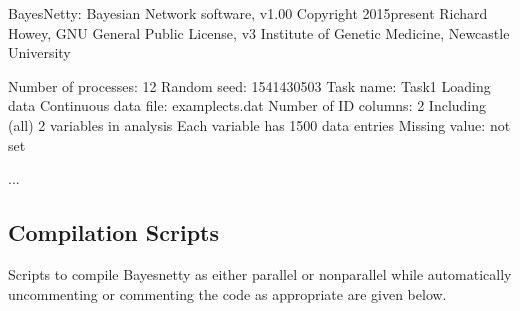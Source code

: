 \documentclass[letterpaper,10pt,english]{sphinxmanual}
\begin{document}
\begin{sphinxVerbatim}[commandchars=\\\{\}]
BayesNetty: Bayesian Network software, v1.00
\PYGZhy{}\PYGZhy{}\PYGZhy{}\PYGZhy{}\PYGZhy{}\PYGZhy{}\PYGZhy{}\PYGZhy{}\PYGZhy{}\PYGZhy{}\PYGZhy{}\PYGZhy{}\PYGZhy{}\PYGZhy{}\PYGZhy{}\PYGZhy{}\PYGZhy{}\PYGZhy{}\PYGZhy{}\PYGZhy{}\PYGZhy{}\PYGZhy{}\PYGZhy{}\PYGZhy{}\PYGZhy{}\PYGZhy{}\PYGZhy{}\PYGZhy{}\PYGZhy{}\PYGZhy{}\PYGZhy{}\PYGZhy{}\PYGZhy{}\PYGZhy{}\PYGZhy{}\PYGZhy{}\PYGZhy{}\PYGZhy{}\PYGZhy{}\PYGZhy{}\PYGZhy{}\PYGZhy{}\PYGZhy{}\PYGZhy{}\PYGZhy{}\PYGZhy{}\PYGZhy{}\PYGZhy{}\PYGZhy{}\PYGZhy{}
Copyright 2015\PYGZhy{}present Richard Howey, GNU General Public License, v3
Institute of Genetic Medicine, Newcastle University

Number of processes: 12
Random seed: 1541430503
\PYGZhy{}\PYGZhy{}\PYGZhy{}\PYGZhy{}\PYGZhy{}\PYGZhy{}\PYGZhy{}\PYGZhy{}\PYGZhy{}\PYGZhy{}\PYGZhy{}\PYGZhy{}\PYGZhy{}\PYGZhy{}\PYGZhy{}\PYGZhy{}\PYGZhy{}\PYGZhy{}\PYGZhy{}\PYGZhy{}\PYGZhy{}\PYGZhy{}\PYGZhy{}\PYGZhy{}\PYGZhy{}\PYGZhy{}\PYGZhy{}\PYGZhy{}\PYGZhy{}\PYGZhy{}\PYGZhy{}\PYGZhy{}\PYGZhy{}\PYGZhy{}\PYGZhy{}\PYGZhy{}\PYGZhy{}\PYGZhy{}\PYGZhy{}\PYGZhy{}\PYGZhy{}\PYGZhy{}\PYGZhy{}\PYGZhy{}\PYGZhy{}\PYGZhy{}\PYGZhy{}\PYGZhy{}\PYGZhy{}\PYGZhy{}
Task name: Task\PYGZhy{}1
Loading data
Continuous data file: example\PYGZhy{}cts.dat
Number of ID columns: 2
Including (all) 2 variables in analysis
Each variable has 1500 data entries
Missing value: not set
\PYGZhy{}\PYGZhy{}\PYGZhy{}\PYGZhy{}\PYGZhy{}\PYGZhy{}\PYGZhy{}\PYGZhy{}\PYGZhy{}\PYGZhy{}\PYGZhy{}\PYGZhy{}\PYGZhy{}\PYGZhy{}\PYGZhy{}\PYGZhy{}\PYGZhy{}\PYGZhy{}\PYGZhy{}\PYGZhy{}\PYGZhy{}\PYGZhy{}\PYGZhy{}\PYGZhy{}\PYGZhy{}\PYGZhy{}\PYGZhy{}\PYGZhy{}\PYGZhy{}\PYGZhy{}\PYGZhy{}\PYGZhy{}\PYGZhy{}\PYGZhy{}\PYGZhy{}\PYGZhy{}\PYGZhy{}\PYGZhy{}\PYGZhy{}\PYGZhy{}\PYGZhy{}\PYGZhy{}\PYGZhy{}\PYGZhy{}\PYGZhy{}\PYGZhy{}\PYGZhy{}\PYGZhy{}\PYGZhy{}\PYGZhy{}
\PYGZhy{}\PYGZhy{}\PYGZhy{}\PYGZhy{}\PYGZhy{}\PYGZhy{}\PYGZhy{}\PYGZhy{}\PYGZhy{}\PYGZhy{}\PYGZhy{}\PYGZhy{}\PYGZhy{}\PYGZhy{}\PYGZhy{}\PYGZhy{}\PYGZhy{}\PYGZhy{}\PYGZhy{}\PYGZhy{}\PYGZhy{}\PYGZhy{}\PYGZhy{}\PYGZhy{}\PYGZhy{}\PYGZhy{}\PYGZhy{}\PYGZhy{}\PYGZhy{}\PYGZhy{}\PYGZhy{}\PYGZhy{}\PYGZhy{}\PYGZhy{}\PYGZhy{}\PYGZhy{}\PYGZhy{}\PYGZhy{}\PYGZhy{}\PYGZhy{}\PYGZhy{}\PYGZhy{}\PYGZhy{}\PYGZhy{}\PYGZhy{}\PYGZhy{}\PYGZhy{}\PYGZhy{}\PYGZhy{}\PYGZhy{}

...
\end{sphinxVerbatim}


\subsection{Compilation Scripts}
\label{\detokenize{parallel:compilation-scripts}}\label{\detokenize{parallel:compile-parallel-code}}
\sphinxAtStartPar
Scripts to compile Bayesnetty as either parallel or non\sphinxhyphen{}parallel while automatically uncommenting or commenting the code as appropriate are given below.
\end{document}
